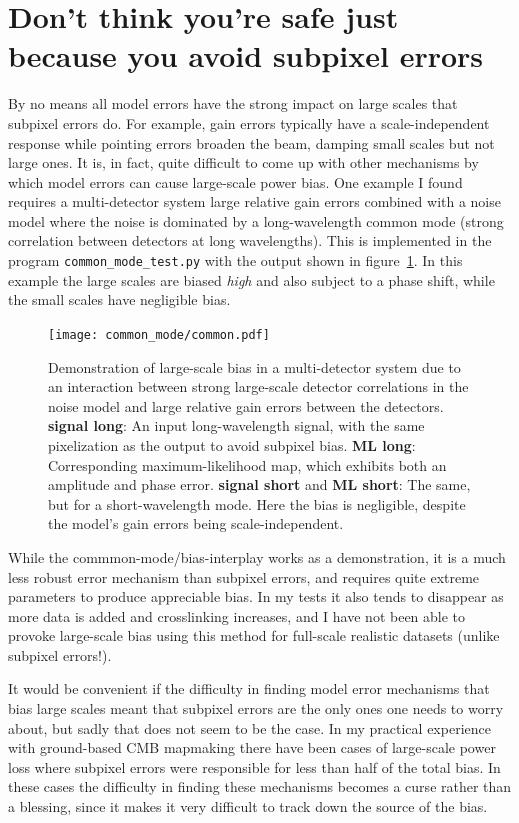 \documentclass[twocolumn,apj]{aastex63}
\newcommand{\dfn}[1]{\textbf{#1}}
\begin{document}
\section{Don't think you're safe just because you avoid subpixel errors}
By no means all model errors have the strong impact on large scales
that subpixel errors do. For example, gain errors typically have a
scale-independent response while pointing errors broaden the beam, damping
small scales but not large ones. It is, in fact, quite difficult to come up
with other mechanisms by which model errors can cause large-scale power
bias. One example I found requires a multi-detector system large relative
gain errors combined with a noise model where the noise is
dominated by a long-wavelength common mode (strong correlation between detectors
at long wavelengths). This is implemented in the program \verb|common_mode_test.py|
with the output shown in figure~\ref{fig:common}. In this example the
large scales are biased \emph{high} and also subject to a phase shift, while
the small scales have negligible bias.

\begin{figure}
	\centering
	\texttt{[image: common\_mode/common.pdf]}
	\caption{
		Demonstration of large-scale bias in a multi-detector system
		due to an interaction between strong large-scale
		detector correlations in the noise model and large
		relative gain errors between the detectors.
		\dfn{signal long}: An input long-wavelength signal,
		with the same pixelization as the output to avoid subpixel bias.
		\dfn{ML long}: Corresponding maximum-likelihood map, which
		exhibits both an amplitude and phase error.
		\dfn{signal short} and \dfn{ML short}: The same, but for a
		short-wavelength mode. Here the bias is negligible,
		despite the model's gain errors being scale-independent.
	}
	\label{fig:common}
\end{figure}

While the commmon-mode/bias-interplay works as a demonstration, it is a much
less robust error mechanism than subpixel errors, and requires quite extreme
parameters to produce appreciable bias. In my tests it also tends to disappear
as more data is added and crosslinking increases, and I have not been able to
provoke large-scale bias using this method for full-scale realistic datasets
(unlike subpixel errors!).

It would be convenient if the difficulty in finding model error mechanisms that
bias large scales meant that subpixel errors are the only ones one needs to
worry about, but sadly that does not seem to be the case. In my practical
experience with ground-based CMB mapmaking there have been cases of large-scale
power loss where subpixel errors were responsible for less than half of the
total bias. In these cases the difficulty in finding these mechanisms becomes
a curse rather than a blessing, since it makes it very difficult to track down
the source of the bias.
\end{document}

